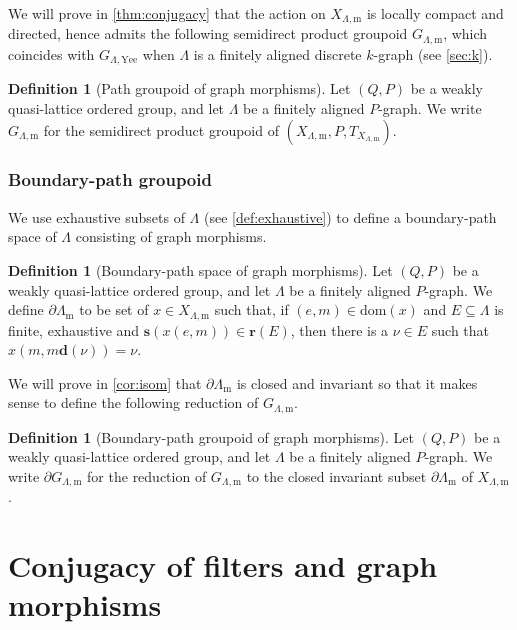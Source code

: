 \documentclass[11pt]{amsart}
\theoremstyle{definition}
\numberwithin{thm}{section}
\numberwithin{equation}{section}
\newtheorem{definition}[thm]{Definition}
\newcommand{\range}{\mathbf{r}}
\newcommand{\source}{\mathbf{s}}
\newcommand{\degree}{\mathbf{d}}
\newcommand{\morphdom}[1]{\mathrm{dom}(#1)}
\newcommand{\ofYeend}{\mathrm{Yee}}
\newcommand{\M}{\mathrm{m}}
\newcommand{\PS}[2]{X_{#2, #1}}
\newcommand{\PG}[2]{{G_{#2, #1}}}
\newcommand{\BPS}[2]{\partial{#2}_{#1}}
\newcommand{\BPG}[2]{\partial\PG{#1}{#2}}
\begin{document}
We will prove in \cref{thm:conjugacy} that the action on $\PS{\M}{\Lambda}$ is locally compact and directed, hence admits the following semidirect product groupoid $\PG{\M}{\Lambda}$, which coincides with $\PG{\ofYeend}{\Lambda}$ when $\Lambda$ is a finitely aligned discrete $k$-graph (see \cref{sec:k}).

\begin{definition}[Path groupoid of graph morphisms]
\label{def:PGmorph}
Let $(Q, P)$ be a weakly quasi-lattice ordered group, and let $\Lambda$ be a finitely aligned $P$-graph.
We write $\PG{\M}{\Lambda}$ for the semidirect product groupoid of $(\PS{\M}{\Lambda}, P, T_{\PS{\M}{\Lambda}})$.
\end{definition}

\subsubsection{Boundary-path groupoid}

We use exhaustive subsets of $\Lambda$ (see \cref{def:exhaustive}) to define a boundary-path space of $\Lambda$ consisting of graph morphisms.

\begin{definition}[Boundary-path space of graph morphisms]
\label{def:BPSmorph}
Let $(Q, P)$ be a weakly quasi-lattice ordered group, and let $\Lambda$ be a finitely aligned $P$-graph. 
We define $\BPS{\M}{\Lambda}$ to be set of $x \in \PS{\M}{\Lambda}$ such that, if $(e, m) \in \morphdom{x}$ and $E \subseteq \Lambda$ is finite, exhaustive and $\source(x(e, m)) \in \range(E)$, then there is a $\nu \in E$ such that $x(m, m\degree(\nu)) = \nu$.
\end{definition}

We will prove in \cref{cor:isom} that $\BPS{\M}{\Lambda}$ is closed and invariant so that it makes sense to define the following reduction of $\PG{\M}{\Lambda}$.

\begin{definition}[Boundary-path groupoid of graph morphisms]
\label{def:BPGmorph}
Let $(Q, P)$ be a weakly quasi-lattice ordered group, and let $\Lambda$ be a finitely aligned $P$-graph.
We write $\BPG{\M}{\Lambda}$ for the reduction of $\PG{\M}{\Lambda}$ to the closed invariant subset $\BPS{\M}{\Lambda}$ of $\PS{\M}{\Lambda}$.
\end{definition}

\section{Conjugacy of filters and graph morphisms}    
\label{sec:conjugacy_of_filters_and_morphisms}
\end{document}
